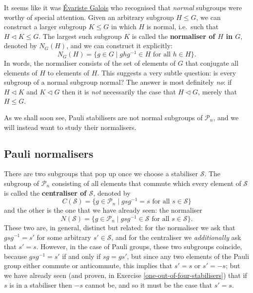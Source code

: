\documentclass[fleqn]{article}
\begin{document}
It seems like it was \href{https://en.wikipedia.org/wiki/Évariste_Galois}{Évariste Galois} who recognised that \emph{normal} subgroups were worthy of special attention.
Given an arbitrary subgroup \(H\leqslant G\), we can construct a larger subgroup \(K\leqslant G\) in which \(H\) is normal, i.e.~such that \(H\triangleleft K\leqslant G\).
The largest such subgroup \(K\) is called the \textbf{normaliser of \(H\) in \(G\)}, denoted by \(N_G(H)\), and we can construct it explicitly:
\[
  N_G(H) = \{g\in G \mid ghg^{-1}\in H\text{ for all }h\in H\}.
\]
In words, the normaliser consists of the set of elements of \(G\) that conjugate all elements of \(H\) to elements of \(H\).
This suggests a very subtle question: is every subgroup of a normal subgroup normal?
The answer is most definitely \emph{no}: if \(H\triangleleft K\) and \(K\triangleleft G\) then it is \emph{not} necessarily the case that \(H\triangleleft G\), merely that \(H\leqslant G\).

As we shall soon see, Pauli stabilisers are not normal subgroups of \(\mathcal{P}_n\), and we will instead want to study their normalisers.

\hypertarget{pauli-normalisers}{%
\subsection{Pauli normalisers}\label{pauli-normalisers}}

There are two subgroups that pop up once we choose a stabiliser \(\mathcal{S}\).
The subgroup of \(\mathcal{P}_n\) consisting of all elements that commute which every element of \(\mathcal{S}\) is called the \textbf{centraliser of \(\mathcal{S}\)}, denoted by
\[
  C(\mathcal{S}) = \{g\in\mathcal{P}_n \mid gsg^{-1}=s\text{ for all }s\in\mathcal{S}\}
\]
and the other is the one that we have already seen: the normaliser
\[
  N(\mathcal{S}) = \{g\in\mathcal{P}_n \mid gsg^{-1}\in\mathcal{S}\text{ for all }s\in\mathcal{S}\}.
\]
These two are, in general, distinct but related: for the normaliser we ask that \(gsg^{-1}=s'\) for some arbitrary \(s'\in\mathcal{S}\), and for the centraliser we \emph{additionally} ask that \(s'=s\).
However, in the case of Pauli groups, these two subgroups coincide, because \(gsg^{-1}=s'\) if and only if \(sg=gs'\), but since any two elements of the Pauli group either commute or anticommute, this implies that \(s'=s\) or \(s'=-s\); but we have already seen (and proven, in Exercise \ref{one-out-of-four-stabilisers}) that if \(s\) is in a stabiliser then \(-s\) cannot be, and so it must be the case that \(s'=s\).
\end{document}
